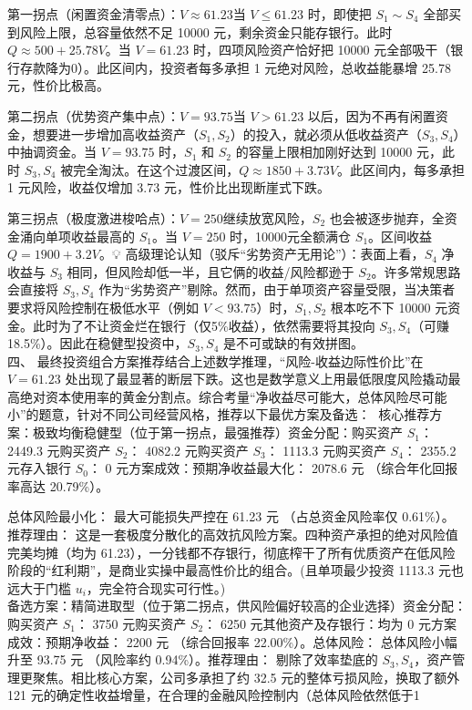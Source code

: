 \documentclass[UTF8]{article}
\begin{document}
第一拐点（闲置资金清零点）：$V \approx 61.23$当 $V \le 61.23$ 时，即使把 $S_1 \sim S_4$ 全部买到风险上限，总容量依然不足 10000 元，剩余资金只能存银行。此时 $Q \approx 500 + 25.78V$。当 $V=61.23$ 时，四项风险资产恰好把 10000 元全部吸干（银行存款降为0）。此区间内，投资者每多承担 1 元绝对风险，总收益能暴增 25.78 元，性价比极高。

第二拐点（优势资产集中点）：$V = 93.75$当 $V > 61.23$ 以后，因为不再有闲置资金，想要进一步增加高收益资产（$S_1, S_2$）的投入，就必须从低收益资产（$S_3, S_4$）中抽调资金。当 $V = 93.75$ 时，$S_1$ 和 $S_2$ 的容量上限相加刚好达到 10000 元，此时 $S_3, S_4$ 被完全淘汰。在这个过渡区间，$Q \approx 1850 + 3.73V$。此区间内，每多承担 1 元风险，收益仅增加 3.73 元，性价比出现断崖式下跌。

第三拐点（极度激进梭哈点）：$V = 250$继续放宽风险，$S_2$ 也会被逐步抛弃，全资金涌向单项收益最高的 $S_1$。当 $V=250$ 时，10000元全额满仓 $S_1$。区间收益 $Q = 1900 + 3.2V$。💡 高级理论认知（驳斥“劣势资产无用论”）：表面上看，$S_4$ 净收益与 $S_3$ 相同，但风险却低一半，且它俩的收益/风险都逊于 $S_2$。许多常规思路会直接将 $S_3, S_4$ 作为“劣势资产”剔除。然而，由于单项资产容量受限，当决策者要求将风险控制在极低水平（例如 $V<93.75$）时，$S_1, S_2$ 根本吃不下 10000 元资金。此时为了不让资金烂在银行（仅5\%收益），依然需要将其投向 $S_3, S_4$（可赚18.5\%）。因此在稳健型投资中，$S_3, S_4$ 是不可或缺的有效拼图。\\

四、 最终投资组合方案推荐结合上述数学推理，“风险-收益边际性价比”在 $V=61.23$ 处出现了最显著的断层下跌。这也是数学意义上用最低限度风险撬动最高绝对资本使用率的黄金分割点。综合考量“净收益尽可能大，总体风险尽可能小”的题意，针对不同公司经营风格，推荐以下最优方案及备选：🌟 核心推荐方案：极致均衡稳健型（位于第一拐点，最强推荐）资金分配：购买资产 $S_1$： 2449.3 元购买资产 $S_2$： 4082.2 元购买资产 $S_3$： 1113.3 元购买资产 $S_4$： 2355.2 元存入银行 $S_0$： 0 元方案成效：预期净收益最大化： 2078.6 元 （综合年化回报率高达 20.79\%）。

总体风险最小化： 最大可能损失严控在 61.23 元 （占总资金风险率仅 0.61\%）。推荐理由： 这是一套极度分散化的高效抗风险方案。四种资产承担的绝对风险值完美均摊（均为 61.23），一分钱都不存银行，彻底榨干了所有优质资产在低风险阶段的“红利期”，是商业实操中最高性价比的组合。(且单项最少投资 1113.3 元也远大于门槛 $u_i$，完全符合现实可行性。)\\备选方案：精简进取型（位于第二拐点，供风险偏好较高的企业选择）资金分配：购买资产 $S_1$： 3750 元购买资产 $S_2$： 6250 元其他资产及存银行：均为 0 元方案成效：预期净收益： 2200 元 （综合回报率 22.00\%）。总体风险： 总体风险小幅升至 93.75 元 （风险率约 0.94\%）。推荐理由： 剔除了效率垫底的 $S_3, S_4$，资产管理更聚焦。相比核心方案，公司多承担了约 32.5 元的整体亏损风险，换取了额外 121 元的确定性收益增量，在合理的金融风险控制内（总体风险依然低于1%
\end{document}
